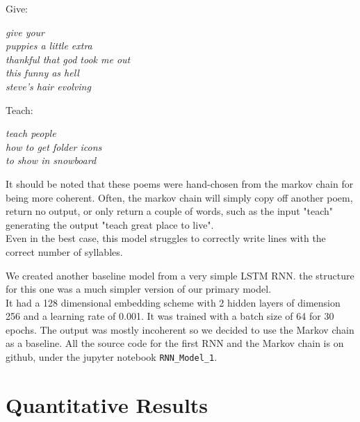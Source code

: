 \documentclass{article} %
\begin{document}
Give:
\begin{flushleft}
  \textit{
      \hspace{2em} give your \\
      \hspace{2em} puppies a little extra\\
      \hspace{2em} thankful that god took me out\\
      \hspace{2em} this funny as hell\\
      \hspace{2em} steve's hair evolving\\
  }
\end{flushleft}


 Teach:
 \begin{flushleft}
  \textit{
      \hspace{2em} teach people  \\
      \hspace{2em} how to get folder icons\\
      \hspace{2em} to show in snowboard\\
  }
\end{flushleft}

It should be noted that these poems were hand-chosen from the markov chain for being more coherent. Often, the markov chain will simply copy
off another poem, return no output, or only return a couple of words, such as the input "teach" generating the output "teach great place to live".\\

Even in the best case, this model struggles to correctly write lines with the correct number of syllables.

We created another baseline model from a very simple LSTM RNN. the structure for this one was a much simpler version of our primary model.\\

It had a 128 dimensional embedding scheme with 2 hidden layers of dimension 256 and a learning rate of 0.001. It was trained with a batch size of 64
for 30 epochs. The output was mostly incoherent so we decided to use the Markov chain as a baseline. All the source code for the first RNN and the
Markov chain is on github, under the jupyter notebook \texttt{RNN\_Model\_1}.


\section{Quantitative Results}
\end{document}
